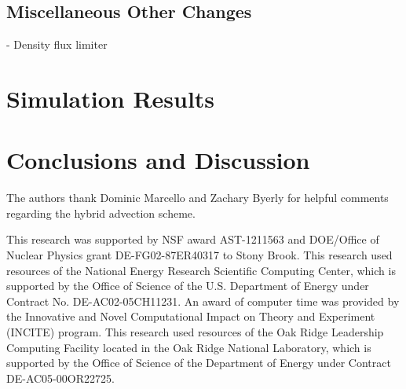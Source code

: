 \documentclass[twocolumn,numberedappendix]{../aastex60}
\begin{document}
\subsection{Miscellaneous Other Changes}
\label{sec:hydro-other-changes}

- Density flux limiter



\section{Simulation Results}\label{sec:results}



\section{Conclusions and Discussion}\label{sec:Conclusions and Discussion}


\acknowledgments

The authors thank Dominic Marcello and Zachary Byerly for helpful comments
regarding the hybrid advection scheme.

This research was supported by NSF award AST-1211563 and DOE/Office of
Nuclear Physics grant DE-FG02-87ER40317 to Stony Brook.  This
research used resources of the National Energy Research Scientific
Computing Center, which is supported by the Office of Science of the
U.S. Department of Energy under Contract No. DE-AC02-05CH11231.  An
award of computer time was provided by the Innovative and Novel
Computational Impact on Theory and Experiment (INCITE) program.  This
research used resources of the Oak Ridge Leadership Computing Facility
located in the Oak Ridge National Laboratory, which is supported by
the Office of Science of the Department of Energy under Contract
DE-AC05-00OR22725.

\clearpage





\clearpage
\appendix
\end{document}
